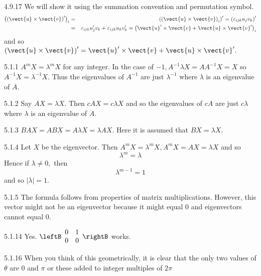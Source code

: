 \begin{Answer}{4.9.17}
We will show it using the summation convention and permutation symbol.
\begin{eqnarray*}
\left( \left( \vect{u}\times \vect{v}\right) ^{\prime }\right) _{i} &=
&\left( \left( \vect{u}\times \vect{v}\right) _{i}\right) ^{\prime }=\left(
\varepsilon _{ijk}u_{j}v_{k}\right) ^{\prime } \\
&=&\varepsilon _{ijk}u_{j}^{\prime }v_{k}+\varepsilon
_{ijk}u_{k}v_{k}^{\prime }=\left( \vect{u}^{\prime } \times
\vect{v}+\vect{u}\times \vect{v}^{\prime }\right) _{i}
\end{eqnarray*}
and so $\left( \vect{u}\times \vect{v}\right) ^{\prime }=\vect{u}^{\prime }
\times \vect{v}+\vect{u}\times \vect{v}^{\prime }.$
\end{Answer}
\begin{Answer}{5.1.1}
$A^{m}X=\lambda ^{m}X$ for
any integer. In the case of $-1,A^{-1}\lambda X=AA^{-1}X=X$
so $A^{-1}X =\lambda ^{-1}X$. Thus the eigenvalues of $A^{-1}$ are just $\lambda ^{-1}$ where $\lambda $ is an eigenvalue of $A$.
\end{Answer}
\begin{Answer}{5.1.2}
Say $AX=\lambda X.$ Then $
cAX=c\lambda X$ and so the eigenvalues of $cA$ are just $
c\lambda $ where $\lambda $ is an eigenvalue of $A$.
\end{Answer}
\begin{Answer}{5.1.3}
 $BAX=ABX
=A\lambda X=\lambda AX$. Here it is assumed that $BX=\lambda X$.
\end{Answer}
\begin{Answer}{5.1.4}
Let $X$ be the eigenvector. Then $A^{m}X=\lambda ^{m}
X,A^{m}X=AX=\lambda X$ and so
\[
\lambda ^{m}=\lambda
\]
Hence if $\lambda \neq 0,$ then
\[
\lambda ^{m-1}=1
\]
and so $\left\vert \lambda \right\vert =1.$
\end{Answer}
\begin{Answer}{5.1.5}
The formula follows from properties of matrix multiplications. However,
this vector might not be an eigenvector because it might equal $0$
and eigenvectors cannot equal $0$.
\end{Answer}
\begin{Answer}{5.1.14}
Yes. $\leftB
\begin{array}{cc}
0 & 1 \\
0 & 0%
\end{array}
\rightB $ works.
\end{Answer}
\begin{Answer}{5.1.16}
When you think of this geometrically, it is clear that the only two values
of $\theta $ are 0 and $\pi $ or these added to integer multiples of $2\pi $
\end{Answer}
